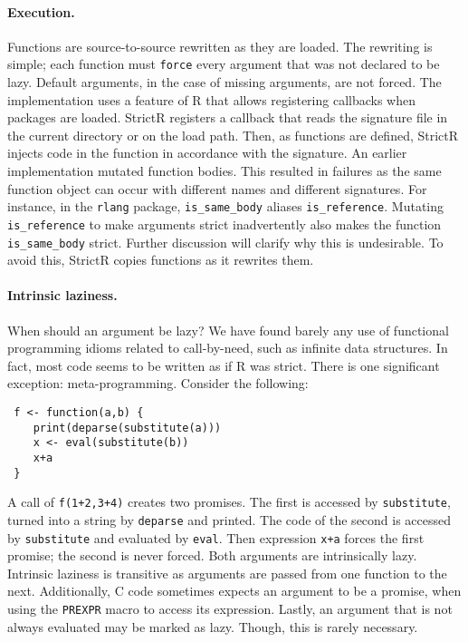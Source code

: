 \documentclass[review,creen,acmsmall]{acmart}
\renewcommand{\c}[1]{\lstinline |#1|\xspace}
\newcommand{\strictr}{{\sf StrictR}\xspace}
\begin{document}
\paragraph{Execution.}
Functions are source-to-source rewritten as they are loaded. The rewriting is
simple; each function must \c{force} every argument that was not declared to be lazy.
Default arguments,
in the case of missing arguments, are not forced. The implementation uses a feature of R that
allows registering callbacks when packages are loaded. \strictr registers a
callback that reads the signature file in the current directory or on the load
path. Then, as functions are defined, \strictr injects code in the function in
accordance with the signature. An earlier implementation mutated function
bodies. This resulted in failures as the same function object can occur with
different names and different signatures. For instance, in the \c{rlang}
package, \c{is_same_body} aliases \c{is_reference}.
Mutating \c{is_reference} to make arguments strict inadvertently also makes
the function \c{is_same_body} strict. Further discussion will clarify why
this is undesirable. To avoid this, \strictr copies functions as it rewrites
them.

\paragraph{Intrinsic laziness.} When should an  argument be lazy?
We have found barely any use of functional programming idioms related to
call-by-need, such as infinite data structures. In fact, most code seems to be
written as if R was strict. There is one significant exception:
meta-programming. Consider the following:
\begin{lstlisting}
 f <- function(a,b) {
    print(deparse(substitute(a)))
    x <- eval(substitute(b))
    x+a
 }
\end{lstlisting}

\medskip

A call of \c{f(1+2,3+4)} creates two promises. The first is accessed by
\c{substitute}, turned into a string by \c{deparse} and printed. The code of the
second is accessed by \c{substitute} and evaluated by \c{eval}. Then expression
\c{x+a} forces the first promise; the second is never forced. Both arguments are
intrinsically lazy. Intrinsic laziness is transitive as arguments are passed
from one function to the next. Additionally, C code sometimes expects an
argument to be a promise, when using the \c{PREXPR} macro to access its
expression. Lastly, an argument that is not always evaluated may be marked as lazy. Though, this
is rarely necessary.
\end{document}

